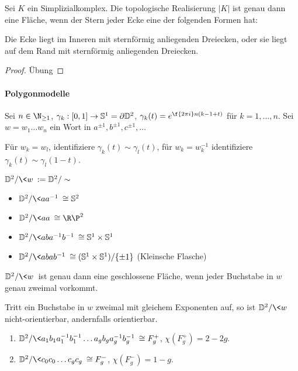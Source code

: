 \begin{st}
	Sei $K$ ein Simplizialkomplex.
	Die topologische Realisierung $|K|$ ist genau dann eine Fläche, wenn der Stern jeder Ecke eine der folgenden Formen hat:

	Die Ecke liegt im Inneren mit sternförmig anliegenden Dreiecken, oder sie liegt auf dem Rand mit sternförmig anliegenden Dreiecken.
	\begin{proof}
		Übung
	\end{proof}
\end{st}

\paragraph{Polygonmodelle}

Sei $n \in \N_{\ge 1}$, $\gamma_k: [0,1] \to \mathbb{S}^1 = \partial \mathbb{D}^2$, $\gamma_k(t) = e^{\f {2\pi i}n (k-1 + t)}$ für $k = 1, \dotsc, n$.
Sei $w = w_1 \dotsc w_n$ ein Wort  in $a^{\pm 1}, b^{\pm 1}, c^{\pm 1}, \dotsc$

Für $w_k = w_l$, identifiziere $\gamma_k(t) \sim \gamma_l(t)$, für $w_k = w_k^{-1}$ identifiziere $\gamma_k(t) \sim \gamma_l(1-t)$.

\begin{df}
	$\D^2 / \<w\> := \D^2 / \sim$
\end{df}

\begin{ex}
	\begin{itemize}
		\item
			$\D^2 / \<aa^{-1}\> \homeomorphic \S^2$
		\item
			$\D^2 / \<aa\> \homeomorphic \R\P^2$
		\item
			$\D^2 / \<aba^{-1}b^{-1}\> \homeomorphic \S^1 \times \S^1$
		\item
			$\D^2 / \<abab^{-1}\> \homeomorphic (\S^1 \times \S^1) / \{\pm 1\}$ (Kleinsche Flasche)
	\end{itemize}
\end{ex}

\begin{st}
	$\D^2 / \<w\>$ ist genau dann eine geschlossene Fläche, wenn jeder Buchstabe in $w$ genau zweimal vorkommt.

	Tritt ein Buchstabe in $w$ zweimal mit gleichem Exponenten auf, so ist $\D^2 / \<w\>$ nicht-orientierbar, andernfalls orientierbar.
\end{st}

\begin{ex}
	\begin{enumerate}[(1)]
		\item
			$\D^2 / \<a_1b_1a_1^{-1}b_1^{-1} \dotsc a_gb_ga_g^{-1}b_g^{-1} \> \homeomorphic F_g^+$,
			$\chi(F_g^+) = 2 - 2g$.
		\item
			$\D^2 / \<c_0c_0 \dotsc c_gc_g\> \homeomorphic F_g^-$,
			$\chi(F_g^-) = 1 - g$.
	\end{enumerate}
\end{ex}

